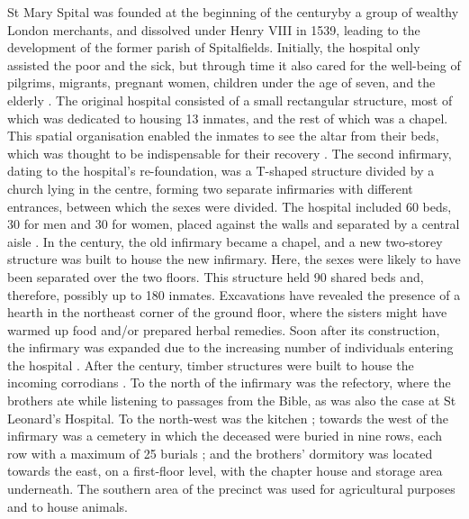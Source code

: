 \documentclass[%
	]{ijsra}
\begin{document}
St Mary Spital was founded at the beginning of the  century\AD by a group of wealthy London merchants, and dissolved under Henry VIII in 1539, leading to the development of the former parish of Spitalfields. Initially, the hospital only assisted the poor and the sick, but through time it also cared for the well-being of pilgrims, migrants, pregnant women, children under the age of seven, and the elderly \parencites[26]{Phillpotts_1997}[48-49]{Thomas_2002}{Unknown_1957}[60-61]{White_2007}.
The original hospital consisted of a small rectangular structure, most of which was dedicated to housing 13 inmates, and the rest of which was a chapel. This spatial organisation enabled the inmates to see the altar from their beds, which was thought to be indispensable for their recovery \parencites[91]{Phillpotts_1997}[98]{Thomas_2002}.
The second infirmary, dating to the hospital’s re-foundation, was a T-shaped structure divided by a church lying in the centre, forming two separate infirmaries with different entrances, between which the sexes were divided. The hospital included 60 beds, 30 for men and 30 for women, placed against the walls and separated by a central aisle \parencites[37]{Phillpotts_1997}[99]{Thomas_2002}. 
In the  century\AD, the old infirmary became a chapel, and a new two-storey structure was built to house the new infirmary. Here, the sexes were likely to have been separated over the two floors. This structure held 90 shared beds and, therefore, possibly up to 180 inmates.
Excavations have revealed the presence of a hearth in the northeast corner of the ground floor, where the sisters might have warmed up food and/or prepared herbal remedies. Soon after its construction, the infirmary was expanded due to the increasing number of individuals entering the hospital \parencites[47]{Phillpotts_1997}[99]{Thomas_2002}[59]{White_2007}. 
After the  century\AD, timber structures were built to house the incoming corrodians \parencite[104,152]{Thomas_2002}.
To the north of the infirmary was the refectory, where the brothers ate while listening to passages from the Bible, as was also the case at St Leonard’s Hospital. 
To the north-west was the kitchen \parencites[51]{Phillpotts_1997}[100]{Thomas_2002}; 
towards the west of the infirmary was a cemetery in which the deceased were buried in nine rows, each row with a maximum of 25 burials \parencite[59]{White_2007}; and the brothers’ dormitory was located towards the east, on a first-floor level, with the chapter house and storage area underneath. The southern area of the precinct was used for agricultural purposes and to house animals.
\end{document}

